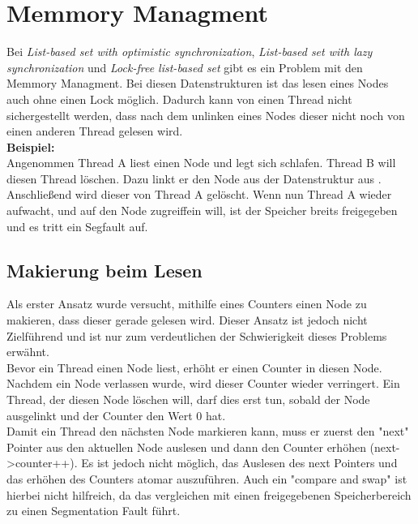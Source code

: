 \section{Memmory Managment}\label{sec:mem}
Bei \textit{List-based set with optimistic synchronization}, \textit{List-based set with lazy synchronization} und \textit{Lock-free list-based set}
gibt es ein Problem mit den Memmory Managment. Bei diesen Datenstrukturen ist das lesen eines Nodes auch ohne einen Lock möglich. 
Dadurch kann von einen Thread nicht sichergestellt werden, dass nach dem unlinken eines Nodes dieser nicht noch von einen anderen Thread gelesen wird.
\\ 
\textbf{Beispiel:}
\\ Angenommen Thread A liest einen Node und legt sich schlafen. Thread B will diesen Thread löschen. Dazu linkt er den Node aus der Datenstruktur aus
. Anschließend wird dieser von Thread A gelöscht. Wenn nun Thread A wieder aufwacht, und auf den Node zugreiffein will, ist der Speicher breits freigegeben
und es tritt ein Segfault auf. 

\subsection{Makierung beim Lesen}
Als erster Ansatz wurde versucht, mithilfe eines Counters einen Node zu makieren, dass dieser gerade gelesen wird. Dieser Ansatz ist jedoch nicht 
Zielführend und ist nur zum verdeutlichen der Schwierigkeit dieses Problems erwähnt. \\
Bevor ein Thread einen Node liest, erhöht er einen Counter in diesen Node. Nachdem ein Node verlassen wurde, wird dieser Counter wieder verringert.
Ein Thread, der diesen Node löschen will, darf dies erst tun, sobald der Node ausgelinkt und der Counter den Wert 0 hat. \\
Damit ein Thread den nächsten Node markieren kann, muss er zuerst den "next" Pointer aus den aktuellen Node auslesen und dann den Counter erhöhen (next->counter++).
Es ist jedoch nicht möglich, das Auslesen des next Pointers und das erhöhen des Counters atomar auszuführen. Auch ein "compare and swap" ist hierbei nicht hilfreich,
da das vergleichen mit einen freigegebenen Speicherbereich zu einen Segmentation Fault führt. 


